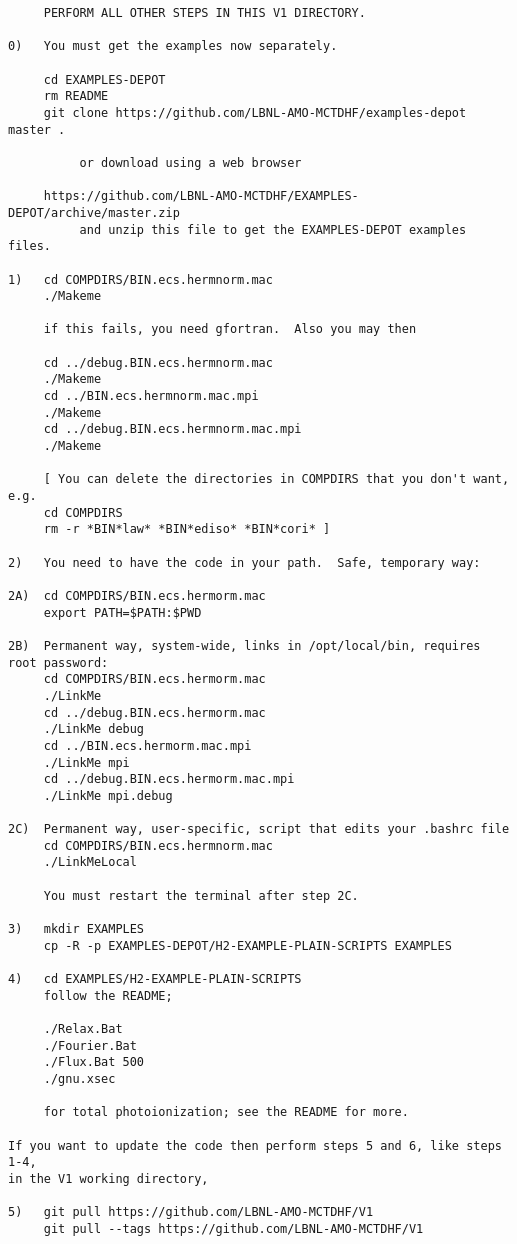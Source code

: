 \begin{verbatim}
     PERFORM ALL OTHER STEPS IN THIS V1 DIRECTORY.

0)   You must get the examples now separately.

     cd EXAMPLES-DEPOT
     rm README
     git clone https://github.com/LBNL-AMO-MCTDHF/examples-depot master .

          or download using a web browser

     https://github.com/LBNL-AMO-MCTDHF/EXAMPLES-DEPOT/archive/master.zip
          and unzip this file to get the EXAMPLES-DEPOT examples files.

1)   cd COMPDIRS/BIN.ecs.hermnorm.mac
     ./Makeme

     if this fails, you need gfortran.  Also you may then

     cd ../debug.BIN.ecs.hermnorm.mac
     ./Makeme
     cd ../BIN.ecs.hermnorm.mac.mpi
     ./Makeme
     cd ../debug.BIN.ecs.hermnorm.mac.mpi
     ./Makeme

     [ You can delete the directories in COMPDIRS that you don't want, e.g.
     cd COMPDIRS
     rm -r *BIN*law* *BIN*ediso* *BIN*cori* ]

2)   You need to have the code in your path.  Safe, temporary way:

2A)  cd COMPDIRS/BIN.ecs.hermorm.mac
     export PATH=$PATH:$PWD

2B)  Permanent way, system-wide, links in /opt/local/bin, requires root password:
     cd COMPDIRS/BIN.ecs.hermorm.mac
     ./LinkMe
     cd ../debug.BIN.ecs.hermorm.mac
     ./LinkMe debug
     cd ../BIN.ecs.hermorm.mac.mpi
     ./LinkMe mpi
     cd ../debug.BIN.ecs.hermorm.mac.mpi
     ./LinkMe mpi.debug

2C)  Permanent way, user-specific, script that edits your .bashrc file
     cd COMPDIRS/BIN.ecs.hermnorm.mac
     ./LinkMeLocal

     You must restart the terminal after step 2C.

3)   mkdir EXAMPLES
     cp -R -p EXAMPLES-DEPOT/H2-EXAMPLE-PLAIN-SCRIPTS EXAMPLES

4)   cd EXAMPLES/H2-EXAMPLE-PLAIN-SCRIPTS
     follow the README; 

     ./Relax.Bat
     ./Fourier.Bat 
     ./Flux.Bat 500
     ./gnu.xsec

     for total photoionization; see the README for more.
 
If you want to update the code then perform steps 5 and 6, like steps 1-4, 
in the V1 working directory,

5)   git pull https://github.com/LBNL-AMO-MCTDHF/V1
     git pull --tags https://github.com/LBNL-AMO-MCTDHF/V1


\end{verbatim}
